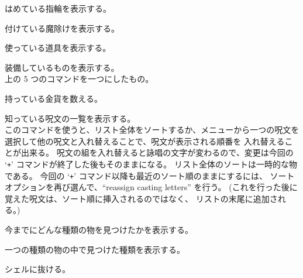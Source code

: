 \item[\tb{=}]
はめている指輪を表示する。
\item[\tb{"}]
付けている魔除けを表示する。
\item[\tb{(}]
使っている道具を表示する。
\item[\tb{*}]
装備しているものを表示する。\\
上の 5 つのコマンドを一つにしたもの。
\item[\tb{\$}]
持っている金貨を数える。
\item[\tb{+}]
知っている呪文の一覧を表示する。\\
このコマンドを使うと、リスト全体をソートするか、メニューから一つの呪文を
選択して他の呪文と入れ替えることで、呪文が表示される順番を
入れ替えることが出来る。
呪文の組を入れ替えると詠唱の文字が変わるので、変更は今回の
`{\tt +}' コマンドが終了した後もそのままになる。
リスト全体のソートは一時的な物である。
今回の `{\tt +}' コマンド以降も最近のソート順のままにするには、
ソートオプションを再び選んで、``reassign casting letters'' を行う。
(これを行った後に覚えた呪文は、ソート順に挿入されるのではなく、
リストの末尾に追加される。)
\item[\tb{$\backslash$}]
今までにどんな種類の物を見つけたかを表示する。
\item[\tb{\`}]
一つの種類の物の中で見つけた種類を表示する。
\item[\tb{!}]
シェルに抜ける。
